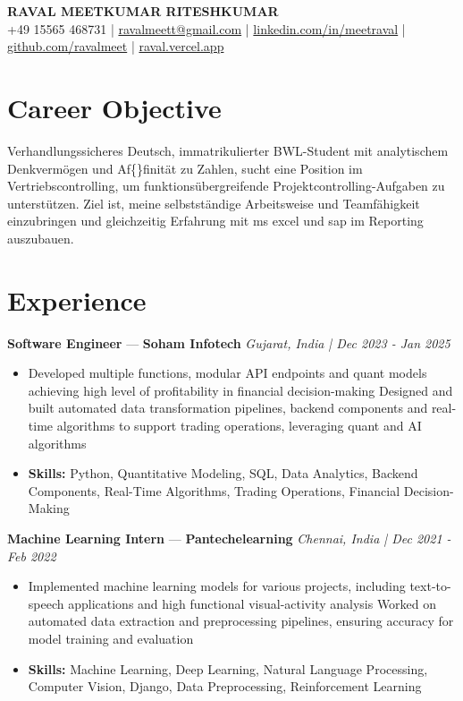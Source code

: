 \documentclass[a4paper,10pt]{article}
\begin{document}
\begin{center}
  {\Large\bfseries RAVAL MEETKUMAR RITESHKUMAR}\\[2pt]
  {\small +49 15565 468731 \;|\; \href{mailto:ravalmeett@gmail.com}{ravalmeett@gmail.com} \;|\; \href{https://www.linkedin.com/in/meetraval/}{linkedin.com/in/meetraval} \;|\; \href{https://github.com/ravalmeet}{github.com/ravalmeet} \;|\; \href{https://raval.vercel.app/}{raval.vercel.app}}
\end{center}
\vspace{-3pt}

\section*{Career Objective}
Verhandlungssicheres Deutsch, immatrikulierter BWL-Student mit analytischem Denkvermögen und Af\{\}finität zu Zahlen, sucht eine Position im Vertriebscontrolling, um funktionsübergreifende Projektcontrolling-Aufgaben zu unterstützen. Ziel ist, meine selbstständige Arbeitsweise und Teamfähigkeit einzubringen und gleichzeitig Erfahrung mit ms excel und sap im Reporting auszubauen.\par

\section*{Experience}
\textbf{Software Engineer} — \textbf{Soham Infotech} \hfill \textit{Gujarat, India \;|\; Dec 2023 - Jan 2025}\par
\vspace{1pt}
\begin{itemize}
  \item Developed multiple functions, modular API endpoints and quant models achieving high level of profitability in financial decision-making Designed and built automated data transformation pipelines, backend components and real-time algorithms to support trading operations, leveraging quant and AI algorithms
  \item \textbf{Skills:} Python, Quantitative Modeling, SQL, Data Analytics, Backend Components, Real-Time Algorithms, Trading Operations, Financial Decision-Making
\end{itemize}
\vspace{3pt}
\textbf{Machine Learning Intern} — \textbf{Pantechelearning} \hfill \textit{Chennai, India \;|\; Dec 2021 - Feb 2022}\par
\vspace{1pt}
\begin{itemize}
  \item Implemented machine learning models for various projects, including text-to-speech applications and high functional visual-activity analysis Worked on automated data extraction and preprocessing pipelines, ensuring accuracy for model training and evaluation
  \item \textbf{Skills:} Machine Learning, Deep Learning, Natural Language Processing, Computer Vision, Django, Data Preprocessing, Reinforcement Learning
\end{itemize}
\end{document}
